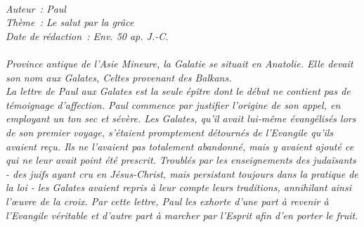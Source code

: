 \BFont
\noindent\hrulefill
{\footnotesize
\textit{
\bigskip
{\centering{}
\\Auteur~: Paul
\\Thème~: Le salut par la grâce
\\Date de rédaction~: Env. 50 ap. J.-C.\\}
}
\textit{
\\Province antique de l'Asie Mineure, la Galatie se situait en Anatolie. Elle devait son nom aux Galates, Celtes provenant des Balkans.
\\La lettre de Paul aux Galates est la seule épître dont le début ne contient pas de témoignage d'affection. Paul commence par justifier l'origine de son appel, en employant un ton sec et sévère. Les Galates, qu'il avait lui-même évangélisés lors de son premier voyage, s'étaient promptement détournés de l'Evangile qu'ils avaient reçu. Ils ne l'avaient pas totalement abandonné, mais y avaient ajouté ce qui ne leur avait point été prescrit. Troublés par les enseignements des judaïsants - des juifs ayant cru en Jésus-Christ, mais persistant toujours dans la pratique de la loi - les Galates avaient repris à leur compte leurs traditions, annihilant ainsi l'œuvre de la croix. Par cette lettre, Paul les exhorte d'une part à revenir à l'Evangile véritable et d'autre part à marcher par l'Esprit afin d'en porter le fruit.\bigskip
}
}
\par\nobreak\noindent\hrulefill
